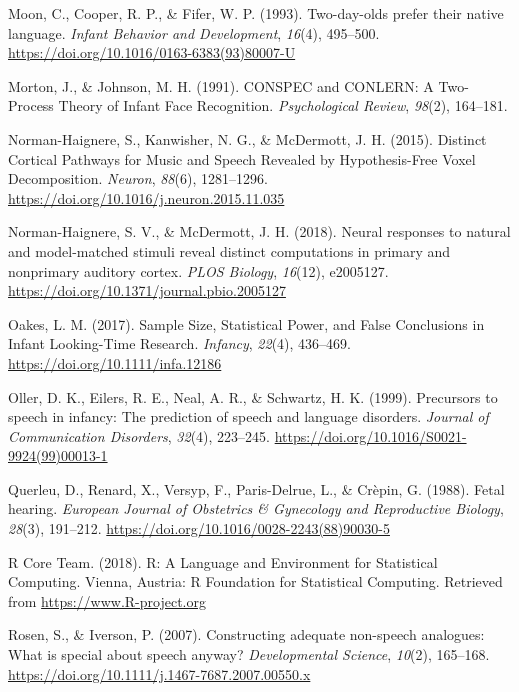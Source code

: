 \documentclass[man]{apa6}
\begin{document}
\leavevmode\hypertarget{ref-moon_two-day-olds_1993}{}%
Moon, C., Cooper, R. P., \& Fifer, W. P. (1993). Two-day-olds prefer their native language. \emph{Infant Behavior and Development}, \emph{16}(4), 495--500. \url{https://doi.org/10.1016/0163-6383(93)80007-U}

\leavevmode\hypertarget{ref-morton_conspec_1991}{}%
Morton, J., \& Johnson, M. H. (1991). CONSPEC and CONLERN: A Two-Process Theory of Infant Face Recognition. \emph{Psychological Review}, \emph{98}(2), 164--181.

\leavevmode\hypertarget{ref-norman-haignere_distinct_2015}{}%
Norman-Haignere, S., Kanwisher, N. G., \& McDermott, J. H. (2015). Distinct Cortical Pathways for Music and Speech Revealed by Hypothesis-Free Voxel Decomposition. \emph{Neuron}, \emph{88}(6), 1281--1296. \url{https://doi.org/10.1016/j.neuron.2015.11.035}

\leavevmode\hypertarget{ref-norman-haignere_neural_2018}{}%
Norman-Haignere, S. V., \& McDermott, J. H. (2018). Neural responses to natural and model-matched stimuli reveal distinct computations in primary and nonprimary auditory cortex. \emph{PLOS Biology}, \emph{16}(12), e2005127. \url{https://doi.org/10.1371/journal.pbio.2005127}

\leavevmode\hypertarget{ref-oakes_sample_2017}{}%
Oakes, L. M. (2017). Sample Size, Statistical Power, and False Conclusions in Infant Looking-Time Research. \emph{Infancy}, \emph{22}(4), 436--469. \url{https://doi.org/10.1111/infa.12186}

\leavevmode\hypertarget{ref-oller_precursors_1999}{}%
Oller, D. K., Eilers, R. E., Neal, A. R., \& Schwartz, H. K. (1999). Precursors to speech in infancy: The prediction of speech and language disorders. \emph{Journal of Communication Disorders}, \emph{32}(4), 223--245. \url{https://doi.org/10.1016/S0021-9924(99)00013-1}

\leavevmode\hypertarget{ref-querleu_fetal_1988}{}%
Querleu, D., Renard, X., Versyp, F., Paris-Delrue, L., \& Crèpin, G. (1988). Fetal hearing. \emph{European Journal of Obstetrics \& Gynecology and Reproductive Biology}, \emph{28}(3), 191--212. \url{https://doi.org/10.1016/0028-2243(88)90030-5}

\leavevmode\hypertarget{ref-r_core_team_r:_2018}{}%
R Core Team. (2018). R: A Language and Environment for Statistical Computing. Vienna, Austria: R Foundation for Statistical Computing. Retrieved from \url{https://www.R-project.org}

\leavevmode\hypertarget{ref-rosen_constructing_2007}{}%
Rosen, S., \& Iverson, P. (2007). Constructing adequate non-speech analogues: What is special about speech anyway? \emph{Developmental Science}, \emph{10}(2), 165--168. \url{https://doi.org/10.1111/j.1467-7687.2007.00550.x}
\end{document}
